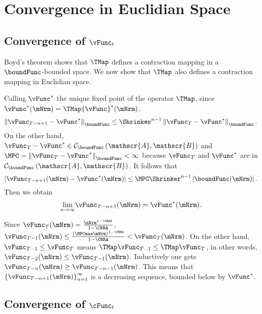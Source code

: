 \documentclass[\econtexRoot/BufferStockTheory]{subfiles}
\begin{document}
\section{Convergence in Euclidian Space}
\subsection{Convergence of
  \texorpdfstring{$\vFunc_{t}$}{vFunc-{t}}}\label{sec:vEuclidian}

Boyd's theorem shows that $\TMap$ defines a contraction mapping
in a $\boundFunc$-bounded space. We now show that $\TMap$ also
defines a contraction mapping in Euclidian space.

Calling $\vFunc^{\ast}$ the unique fixed point of the operator $\TMap$, since $\vFunc^{\ast }(\mNrm)=\TMap {\vFunc}^{\ast }(\mNrm)$,
\begin{equation}
\left\Vert \vFunc_{T-n+1}-\vFunc^{\ast }\right\Vert _{\boundFunc }\leq \Shrinker
^{n-1}\left\Vert \vFunc_{T}-\vFunc^{\ast }\right\Vert _{\boundFunc }.
\end{equation}%
On the other hand, $\vFunc_{T}-\vFunc^{\ast }\in \mathcal{C}_{\boundFunc }\left( \mathscr{A},
\mathscr{B}\right) $ and $\MPC =\left\Vert \vFunc_{T}-\vFunc^{\ast }\right\Vert_{\boundFunc }<\infty $ because $\vFunc_{T}$ and $\vFunc^{\ast }$ are in $\mathcal{C}_{\boundFunc
}\left( \mathscr{A},\mathscr{B}\right) $. It follows that%
\begin{equation}
\left\vert \vFunc_{T-n+1}(\mNrm)-\vFunc^{\ast }(\mNrm)\right\vert \leq \MPC \Shrinker^{n-1}\left\vert \boundFunc(\mNrm)\right\vert.
\end{equation}%
Then we obtain
\begin{equation}
\underset{n\rightarrow \infty }{\lim }\vFunc_{T-n+1}(\mNrm)=\vFunc^{\ast }(\mNrm).
\end{equation}

Since $\vFunc_{T}(\mNrm)=\frac{\mNrm^{1-\CRRA }}{1-\CRRA }$, $\vFunc_{T-1}(\mNrm)\leq \frac{{\left(\MPCmax \mNrm\right)}^{1-\CRRA}}{1-\CRRA}<\vFunc_{T}(\mNrm)$. On the other hand, $\vFunc_{T-1}\leq \vFunc_{T}$
means $\TMap\vFunc_{T-1}\leq \TMap\vFunc_{T}$, in other words, $\vFunc_{T-2}(\mNrm)\leq \vFunc_{T-1}(\mNrm)$.
Inductively one gets $\vFunc_{T-n}(\mNrm)\geq \vFunc_{T-n-1}(\mNrm)$. This means that $\left\{
\vFunc_{T-n+1}(\mNrm)\right\} _{n=1}^{\infty }$ is a decreasing sequence,
bounded below by $\vFunc^{\ast}$.


\subsection{Convergence of
  \texorpdfstring{$\cFunc_{t}$}{cFunc-{t}}}\label{subsec:cConverges}%
\end{document}
